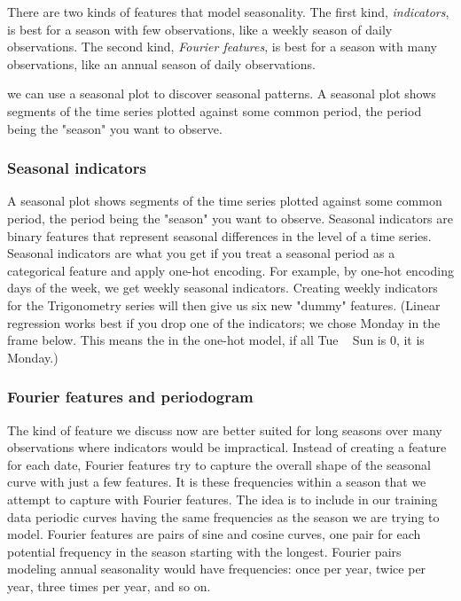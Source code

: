 \documentclass[12pt]{report}
\begin{document}
There are two kinds of features that model seasonality. The first kind, \textit{indicators}, is best for a season with few observations, like a weekly season of daily observations. The second kind, \textit{Fourier features}, is best for a season with many observations, like an annual season of daily observations.

we can use a seasonal plot to discover seasonal patterns. A seasonal plot shows segments of the time series plotted against some common period, the period being the "season" you want to observe.


\subsubsection{Seasonal indicators}
A seasonal plot shows segments of the time series plotted against some common period, the period being the "season" you want to observe. Seasonal indicators are binary features that represent seasonal differences in the level of a time series. Seasonal indicators are what you get if you treat a seasonal period as a categorical feature and apply one-hot encoding. For example, by one-hot encoding days of the week, we get weekly seasonal indicators. Creating weekly indicators for the Trigonometry series will then give us six new "dummy" features. (Linear regression works best if you drop one of the indicators; we chose Monday in the frame below. This means the in the one-hot model, if all Tue ~ Sun is 0, it is Monday.)


\subsubsection{Fourier features and periodogram}

The kind of feature we discuss now are better suited for long seasons over many observations where indicators would be impractical. Instead of creating a feature for each date, Fourier features try to capture the overall shape of the seasonal curve with just a few features. It is these frequencies within a season that we attempt to capture with Fourier features. The idea is to include in our training data periodic curves having the same frequencies as the season we are trying to model. Fourier features are pairs of sine and cosine curves, one pair for each potential frequency in the season starting with the longest. Fourier pairs modeling annual seasonality would have frequencies: once per year, twice per year, three times per year, and so on.
\end{document}
